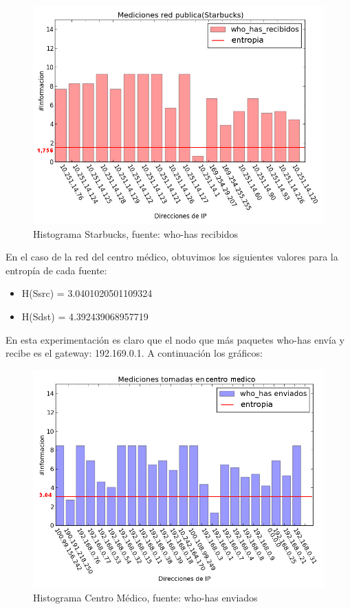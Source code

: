 \begin{figure}[H]
	\begin{center}
		  \includegraphics[scale=0.4]{Graficos/starbucks_received_who_has.png}
		  \caption{Histograma Starbucks, fuente: who-has recibidos}
		  \label{fig:contra1}
	\end{center}
\end{figure}

En el caso de la red del centro médico, obtuvimos los siguientes valores para la entropía de cada fuente:

\begin{itemize}
\item H(Ssrc) = 3.0401020501109324
\item H(Sdst) = 4.392439068957719
\end{itemize}

En esta experimentación es claro que el nodo que más paquetes who-has envía y recibe es el gateway: 192.169.0.1. A continuación los gráficos:

\begin{figure}[!h]
	\begin{center}
		  \includegraphics[scale=0.4]{Graficos/centromedico_sent_who_has.png}
		  \caption{Histograma Centro Médico, fuente: who-has enviados}
		  \label{fig:contra1}
	\end{center}
\end{figure}

